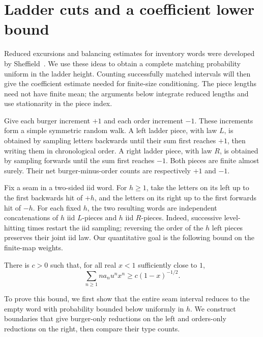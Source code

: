 \section{Ladder cuts and a coefficient lower bound}
\label{ladder:section}

Reduced excursions and balancing estimates for inventory words were
developed by Sheffield~\cite[Section~3.3]{Sheffield2016}.
We use these ideas to obtain a complete matching probability uniform in
the ladder height. Counting successfully matched intervals will then
give the coefficient estimate needed for finite-size conditioning.
The piece lengths need not have finite mean; the arguments below
integrate reduced lengths and use stationarity in the piece index.

Give each burger increment $+1$ and each order increment $-1$.
These increments form a simple symmetric random walk.
A left ladder piece, with law $L$, is obtained by sampling letters backwards
until their sum first reaches $+1$, then writing them in chronological order.
A right ladder piece, with law $R$, is obtained by sampling forwards until
the sum first reaches $-1$.
Both pieces are finite almost surely. Their net burger-minus-order counts
are respectively $+1$ and $-1$.

Fix a seam in a two-sided iid word. For $h\ge1$, take the letters on its
left up to the first backwards hit of $+h$, and the letters on its right
up to the first forwards hit of $-h$.
For each fixed $h$, the two resulting words are independent concatenations
of $h$ iid $L$-pieces and $h$ iid $R$-pieces.
Indeed, successive level-hitting times restart the iid sampling; reversing
the order of the $h$ left pieces preserves their joint iid law.
Our quantitative goal is the following bound on the finite-map weights.

\begin{proposition}
\label{ladder:lower}
There is $c>0$ such that, for all real $x<1$ sufficiently close to $1$,
\begin{equation}
 \sum_{n\ge1} n a_n u^n x^n\ge c(1-x)^{-1/2}.
 \label{ladder:coefficient-bound}
\end{equation}
\end{proposition}

To prove this bound, we first show that the entire seam interval reduces
to the empty word with probability bounded below uniformly in $h$.
We construct boundaries that give burger-only reductions on the left
and orders-only reductions on the right, then compare their type counts.

